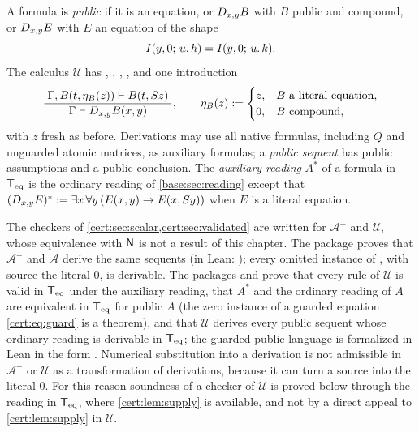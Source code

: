 \begin{definition}\label{cert:def:U}
A formula is \emph{public} if it is an equation, or $D_{x,y}B$ with $B$
public and compound, or $D_{x,y}E$ with $E$ an equation of the shape
\begin{equation}\label{cert:eq:guard}
I(y,0;\,u.\,h)=I(y,0;\,u.\,k).
\end{equation}
The calculus $\mathcal U$ has , , ,
,  and one introduction
\[
\dfrac{\;\Gamma,B(t,\eta_B(z))\vdash B(t,S z)\;}{\;\Gamma\vdash D_{x,y}B(x,y)\;},
\qquad
\eta_B(z)\mathrel{:=}\begin{cases}z,&B\text{ a literal equation},\\0,&B\text{ compound},\end{cases}
\]
with $z$ fresh as before. Derivations may use all native formulas, including
$Q$ and unguarded atomic matrices, as auxiliary formulas; a \emph{public
sequent} has public assumptions and a public conclusion. The \emph{auxiliary
reading} $A^{*}$ of a formula in $\mathsf{T}_{\mathrm{eq}}$ is the ordinary reading of
\cref{base:sec:reading} except that
$(D_{x,y}E)^{*}\mathrel{:=}\exists x\,\forall y\,(E(x,y)\to E(x,S y))$ when $E$ is
a literal equation.
\end{definition}

\begin{remark}\label{cert:rem:imported}
The checkers of \cref{cert:sec:scalar,cert:sec:validated} are written for
$\mathcal A^{-}$ and $\mathcal U$, whose equivalence with $\mathsf{N}$ is not a
result of this chapter. The package  proves that
$\mathcal A^{-}$ and $\mathcal A$ derive the same sequents (in Lean:
); every omitted instance of , with source
the literal $0$, is derivable. The packages  and
 prove that every rule of $\mathcal U$ is valid in $\mathsf{T}_{\mathrm{eq}}$
under the auxiliary reading, that $A^{*}$ and the ordinary reading of $A$ are
equivalent in $\mathsf{T}_{\mathrm{eq}}$ for public $A$ (the zero instance of a guarded equation
\eqref{cert:eq:guard} is a theorem), and that $\mathcal U$ derives every public
sequent whose ordinary reading is derivable in $\mathsf{T}_{\mathrm{eq}}$; the guarded public
language is formalized in Lean in the form . Numerical
substitution into a derivation is not admissible in $\mathcal A^{-}$ or
$\mathcal U$ as a transformation of derivations, because it can turn a source
into the literal $0$. For this reason soundness of a checker of $\mathcal U$
is proved below through the reading in $\mathsf{T}_{\mathrm{eq}}$, where
\cref{cert:lem:supply} is available, and not by a direct appeal to
\cref{cert:lem:supply} in $\mathcal U$.
\end{remark}

